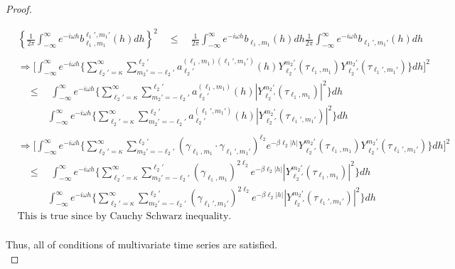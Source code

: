 \documentclass[11pt]{article}
\begin{document}
\begin{itemize}
\begin{proof}
\begin{enumerate}
\begin{align*}
&\left\{ \frac{1}{2\pi} \int_{-\infty}^\infty e^{-i\omega h} b_{\ell_1,m_1}^{\ell_1',m_1'}(h) dh \right\}^2 \quad \le \quad \frac{1}{2\pi} \int_{-\infty}^\infty e^{-i\omega h} b_{\ell_1,m_1}(h) dh \frac{1}{2\pi} \int_{-\infty}^\infty e^{-i\omega h} b_{\ell_1',m_1'}(h) dh \\
\\
&\Rightarrow \biggl[ \int_{-\infty}^\infty e^{-i\omega h} \biggl\{ \sum_{\ell_2'=\kappa}^{\infty} \sum_{m_2'=-\ell_2'}^{\ell_2'} a_{\ell_2'}^{(\ell_1,m_1)(\ell_1',m_1')}(h) Y_{\ell_2'}^{m_2'}(\tau_{\ell_1,m_1}) Y_{\ell_2'}^{m_2'}(\tau_{\ell_1',m_1'}) \biggl\} dh \biggl]^2\\ 
&\quad \le \quad \int_{-\infty}^\infty e^{-i\omega h} \biggl\{ \sum_{\ell_2'=\kappa}^{\infty} \sum_{m_2'=-\ell_2'}^{\ell_2'} a_{\ell_2'}^{(\ell_1,m_1)}(h) |Y_{\ell_2'}^{m_2'}(\tau_{\ell_1,m_1})|^2 \biggl\} dh\\
&\quad \quad \quad \int_{-\infty}^\infty e^{-i\omega h} \biggl\{ \sum_{\ell_2'=\kappa}^{\infty} \sum_{m_2'=-\ell_2'}^{\ell_2'} a_{\ell_2'}^{(\ell_1',m_1')}(h) |Y_{\ell_2'}^{m_2'}(\tau_{\ell_1',m_1'})|^2 \biggl\} dh\\
\\
&\Rightarrow \biggl[ \int_{-\infty}^\infty e^{-i\omega h} \biggl\{ \sum_{\ell_2'=\kappa}^{\infty} \sum_{m_2'=-\ell_2'}^{\ell_2'} (\gamma_{\ell_1,m_1} \cdot \gamma_{\ell_1',m_1'})^{\ell_2} e^{-\beta \ell_2 |h|} Y_{\ell_2'}^{m_2'}(\tau_{\ell_1,m_1}) Y_{\ell_2'}^{m_2'}(\tau_{\ell_1',m_1'}) \biggl\} dh \biggl]^2\\ 
&\quad \le \quad \int_{-\infty}^\infty e^{-i\omega h} \biggl\{ \sum_{\ell_2'=\kappa}^{\infty} \sum_{m_2'=-\ell_2'}^{\ell_2'} (\gamma_{\ell_1,m_1})^{2 \ell_2} e^{-\beta \ell_2 |h|} |Y_{\ell_2'}^{m_2'}(\tau_{\ell_1,m_1})|^2 \biggl\} dh\\
&\quad \quad \quad \int_{-\infty}^\infty e^{-i\omega h} \biggl\{ \sum_{\ell_2'=\kappa}^{\infty} \sum_{m_2'=-\ell_2'}^{\ell_2'} (\gamma_{\ell_1',m_1'})^{2 \ell_2} e^{-\beta \ell_2 |h|} |Y_{\ell_2'}^{m_2'}(\tau_{\ell_1',m_1'})|^2 \biggl\} dh\\
&\text{This is true since by Cauchy Schwarz inequality.}\\
\end{align*}


\end{enumerate}

Thus, all of conditions of multivariate time series are satisfied.\\


\end{proof}
\end{itemize}
\end{document}
